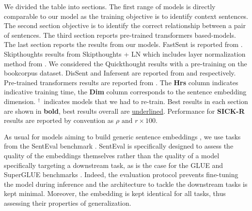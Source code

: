 \begin{table}[!htb]
{We divided the table into sections. The first range of models is directly comparable to our model as the training objective is to identify context sentences. The second section objective is to identify the correct relationship between a pair of sentences. The third section reports pre-trained transformers based-models. The last section reports the results from our models. FastSent is reported from \textcite{hill_16}. Skipthoughts results from \textcite{kiros_15} Skipthoughts + LN which includes layer normalization method from \textcite{ba_16}. We considered the Quickthought results \cite{logeswaran_18} with a pre-training on the bookcorpus dataset. DisSent and Infersent are reported from \textcite{nie_19} and \textcite{conneau_17} respectively. Pre-trained transformers results are reported from \textcite{reimers_19}. The \textbf{Hrs} column indicates indicative training time, the \textbf{Dim} column corresponds to the sentence embedding dimension. $^\dagger$\, indicates models that we had to re-train. Best results in each section are shown in \textbf{bold}, best results overall are \underline{underlined}. Performance for \textbf{SICK-R} results are reported by convention as $\rho \text{ and } r \times 100$.}
\end{table}

As usual for models aiming to build generic sentence embeddings \textcite{kiros_15, hill_16, arora_17, conneau_17, logeswaran_18, nie_19}, we use tasks from the SentEval benchmark \parencite{conneau_18}. SentEval is specifically designed to assess the quality of the embeddings themselves rather than the quality of a model specifically targeting a downstream task, as is the case for the GLUE and SuperGLUE benchmarks \parencite{wang_19_glue, wang_19_superglue}. Indeed, the evaluation protocol prevents fine-tuning the model during inference and the architecture to tackle the downstream tasks is kept minimal. Moreover, the embedding is kept identical for all tasks, thus assessing their properties of generalization. 

